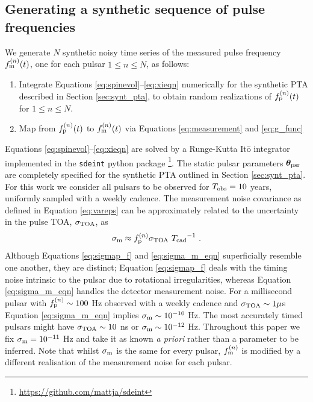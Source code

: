 \documentclass[fleqn,usenatbib,useAMS]{mnras}
\begin{document}
\subsection{Generating a synthetic sequence of pulse frequencies}\label{sec:gendata}
We generate $N$ synthetic noisy time series of the measured pulse frequency $f_{\rm m}^{(n)}(t)$, one for each pulsar $1\leq n \leq N$, as follows:
\begin{enumerate}[leftmargin=2em]
	\item Integrate Equations \eqref{eq:spinevol}--\eqref{eq:xieqn} numerically for the synthetic PTA described in Section \ref{sec:synt_pta}, to obtain random realizations of $f_{\rm p}^{(n)}(t)$ for $1\leq n \leq N$.
	\item Map from $f_{\rm p}^{(n)}(t)$ to $f_{\rm m}^{(n)}(t)$ via Equations \eqref{eq:measurement} and \eqref{eq:g_func}
\end{enumerate}
Equations \eqref{eq:spinevol}--\eqref{eq:xieqn} are solved by a Runge-Kutta It$\hat{\text{o}}$ integrator implemented in the \texttt{sdeint} python package \footnote{\url{https://github.com/mattja/sdeint}}. The static pulsar parameters  $\boldsymbol{\theta}_{\rm psr}$ are completely specified for the synthetic PTA outlined in Section \eqref{sec:synt_pta}. For this work we consider all pulsars to be observed for $T_{\rm obs} =10$ years, uniformly sampled with a weekly cadence. The measurement noise covariance as defined in Equation \eqref{eq:vareps} can be approximately related to the uncertainty in the pulse TOA, $\sigma_{\rm TOA}$, as
\begin{equation}
	\sigma_{\rm m} \approx f_{\rm p}^{(n)} \sigma_{\rm TOA} \ {T_{\rm cad}}^{-1} \ . \label{eq:sigma_m_eqn}
\end{equation}
Although Equations \eqref{eq:sigmap_f} and \eqref{eq:sigma_m_eqn} superficially resemble one another, they are distinct; Equation \eqref{eq:sigmap_f} deals with the timing noise intrinsic to the pulsar due to rotational irregularities, whereas Equation \eqref{eq:sigma_m_eqn} handles the detector measurement noise. For a millisecond pulsar with $f_{\rm p}^{(n)} \sim 100$ Hz observed with a weekly cadence and $\sigma_{\rm TOA} \sim 1 \mu$s Equation \eqref{eq:sigma_m_eqn} implies $\sigma_{\rm m} \sim 10^{-10}$ Hz. The most accurately timed pulsars might have $\sigma_{\rm TOA} \sim 10 $ ns or $\sigma_{\rm m} \sim 10^{-12}$ Hz. Throughout this paper we fix $\sigma_{\rm m} = 10^{-11}$ Hz and take it as known \textit{a priori} rather than a parameter to be inferred. Note that whilst $\sigma_{\rm m}$ is the same for every pulsar, $f_{\rm m} ^{(n)}$ is modified by a different realisation of the measurement noise for each pulsar. \newline 
\end{document}
